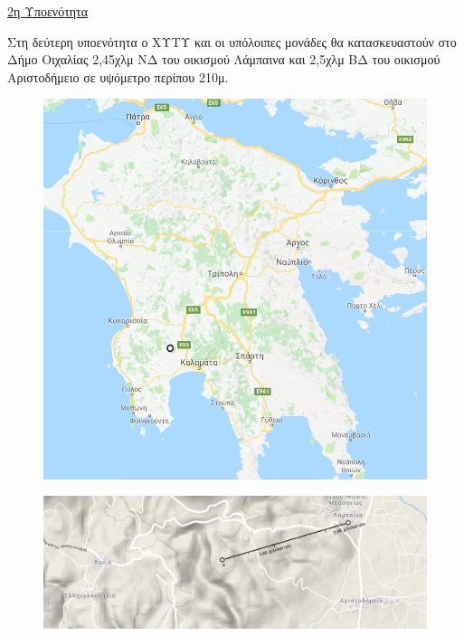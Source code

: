 \documentclass[12pt]{article}
\begin{document}
 	\underline{2η Υποενότητα}
 	
 	Στη δεύτερη υποενότητα ο ΧΥΤΥ και οι υπόλοιπες μονάδες  θα κατασκευαστούν στο Δήμο Οιχαλίας 2,45χλμ ΝΔ του οικισμού Λάμπαινα και 2,5χλμ ΒΔ του οικισμού Αριστοδήμειο σε υψόμετρο περίπου 210μ.
 	
 	\begin{figure} [H]
 		\begin{center}
 			\includegraphics [scale = 0.40] {map43.png}
 		\end{center}
 	\end{figure}
 
 	\begin{figure} [H]
 		\begin{center}
 			\includegraphics [scale = 0.45] {map44.png}
 		\end{center}
 	\end{figure}
 
\end{document}
